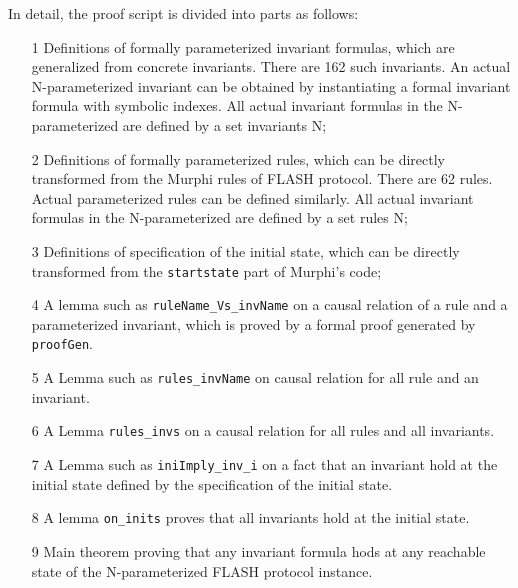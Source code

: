 \documentclass{llncs}
\begin{document}
In detail, the proof script is divided into   parts as follows:
\begin{enumerate}
\item[1] Definitions of formally parameterized invariant formulas, which are generalized from concrete invariants. There are 162 such invariants. An actual N-parameterized invariant can be obtained by instantiating a formal invariant formula with symbolic indexes. All   actual invariant formulas in the N-parameterized are defined by a set invariants N;

\item[2] Definitions of formally parameterized rules,  which can be directly transformed from the  Murphi rules of FLASH protocol. There are 62 rules.  Actual parameterized rules can be defined similarly. All actual invariant formulas in the N-parameterized are defined by a set rules N;

\item[3]  Definitions of specification of the initial state, which can be directly transformed from the {\tt startstate} part of Murphi's code;

\item[4] A lemma  such as {\tt ruleName\_Vs\_invName} on a causal relation of a rule and a parameterized invariant, which is proved by a formal proof  generated by {\tt proofGen}. %


\item[5]  A  Lemma  such as {\tt rules\_invName} on causal relation for  all rule and an invariant.%


\item[6] A Lemma {\tt rules\_invs} on a causal relation for all rules and all invariants. %

\item[7] A Lemma such as {\tt iniImply\_inv\_i} on a fact that an invariant  hold at the initial state defined by the specification of the initial state. %

\item[8] A lemma {\tt on\_inits} proves that all invariants hold at the initial state. %

\item[9] Main theorem  proving that any invariant formula  hods at any reachable state of the  N-parameterized FLASH protocol instance.
\end{enumerate}
\end{document}
